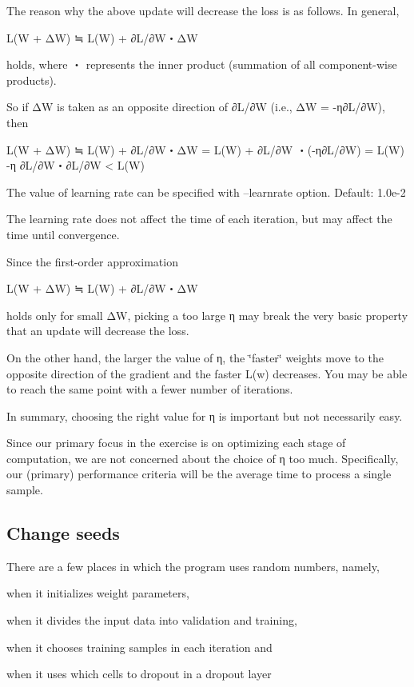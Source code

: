 The reason why the above update will decrease the loss is as follows. In general, \begin{DoxyVerb}L(W + ΔW) ≒ L(W) + ∂L/∂W・ΔW
\end{DoxyVerb}


holds, where ・ represents the inner product (summation of all component-\/wise products).

So if ΔW is taken as an opposite direction of ∂\+L/∂W (i.\+e., ΔW = -\/η∂\+L/∂W), then \begin{DoxyVerb}L(W + ΔW) ≒ L(W) + ∂L/∂W・ΔW
           = L(W) + ∂L/∂W ・(-η∂L/∂W)
           = L(W) -η ∂L/∂W・∂L/∂W
           < L(W)
\end{DoxyVerb}


The value of learning rate can be specified with --learnrate option. Default\+: 1.\+0e-\/2

The learning rate does not affect the time of each iteration, but may affect the time until convergence.

Since the first-\/order approximation \begin{DoxyVerb}L(W + ΔW) ≒ L(W) + ∂L/∂W・ΔW
\end{DoxyVerb}


holds only for small ΔW, picking a too large η may break the very basic property that an update will decrease the loss.

On the other hand, the larger the value of η, the \char`\"{}faster\char`\"{} weights move to the opposite direction of the gradient and the faster L(w) decreases. You may be able to reach the same point with a fewer number of iterations.

In summary, choosing the right value for η is important but not necessarily easy.

Since our primary focus in the exercise is on optimizing each stage of computation, we are not concerned about the choice of η too much. Specifically, our (primary) performance criteria will be the average time to process a single sample.

\subsection*{Change seeds }

There are a few places in which the program uses random numbers, namely,


\begin{DoxyItemize}
\item when it initializes weight parameters,
\item when it divides the input data into validation and training,
\item when it chooses training samples in each iteration and
\item when it uses which cells to dropout in a dropout layer
\end{DoxyItemize}

